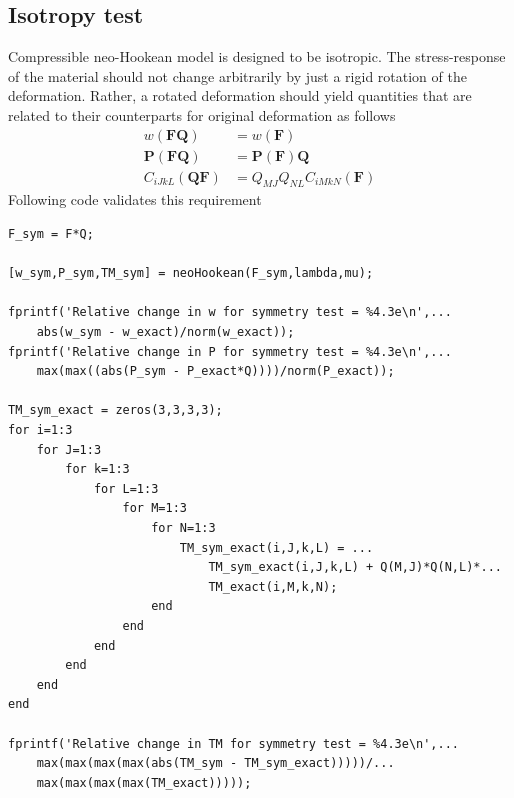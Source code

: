 \documentclass[../main.tex]{subfiles}
\begin{document}
\subsection{Isotropy test}
\label{sec:isotropy}
Compressible neo-Hookean model is designed to be isotropic. The
stress-response of the material should not change arbitrarily by just
a rigid rotation of the deformation. Rather, a rotated deformation
should yield quantities that are related to their counterparts for
original deformation as follows
\begin{align*}
  w(\mathbf{FQ}) &= w(\mathbf{F})\\
  \mathbf{P}(\mathbf{FQ}) &= \mathbf{P}(\mathbf{F})\mathbf{Q}\\
  C_{iJkL}(\mathbf{QF}) &= Q_{MJ}Q_{NL}C_{iMkN}(\mathbf{F})
\end{align*}
Following code validates this requirement
\begin{lstlisting}[style=Matlab-editor]
%% Symmetry test
F_sym = F*Q;

[w_sym,P_sym,TM_sym] = neoHookean(F_sym,lambda,mu);

fprintf('Relative change in w for symmetry test = %4.3e\n',...
    abs(w_sym - w_exact)/norm(w_exact));
fprintf('Relative change in P for symmetry test = %4.3e\n',...
    max(max((abs(P_sym - P_exact*Q))))/norm(P_exact));

TM_sym_exact = zeros(3,3,3,3);
for i=1:3
    for J=1:3
        for k=1:3
            for L=1:3
                for M=1:3
                    for N=1:3
                        TM_sym_exact(i,J,k,L) = ...
                            TM_sym_exact(i,J,k,L) + Q(M,J)*Q(N,L)*...
                            TM_exact(i,M,k,N);
                    end
                end
            end
        end
    end
end

fprintf('Relative change in TM for symmetry test = %4.3e\n',...
    max(max(max(max(abs(TM_sym - TM_sym_exact)))))/...
    max(max(max(max(TM_exact)))));
\end{lstlisting}
\end{document}
